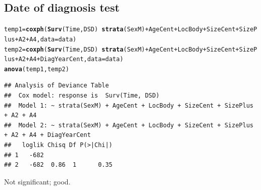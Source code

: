 \documentclass{article}\usepackage[]{graphicx}\usepackage[]{color}
\makeatletter
\newcommand{\hlopt}[1]{\textcolor[rgb]{0,0,0}{#1}}%
\newcommand{\hlstd}[1]{\textcolor[rgb]{0.345,0.345,0.345}{#1}}%
\newcommand{\hlkwb}[1]{\textcolor[rgb]{0.69,0.353,0.396}{#1}}%
\newcommand{\hlkwc}[1]{\textcolor[rgb]{0.333,0.667,0.333}{#1}}%
\newcommand{\hlkwd}[1]{\textcolor[rgb]{0.737,0.353,0.396}{\textbf{#1}}}%
\newenvironment{kframe}{%
 \def\at@end@of@kframe{}%
 \ifinner\ifhmode%
  \def\at@end@of@kframe{\end{minipage}}%
  \begin{minipage}{\columnwidth}%
 \fi\fi%
 \def\FrameCommand##1{\hskip\@totalleftmargin \hskip-\fboxsep
 \colorbox{shadecolor}{##1}\hskip-\fboxsep
     \hskip-\linewidth \hskip-\@totalleftmargin \hskip\columnwidth}%
 \MakeFramed {\advance\hsize-\width
   \@totalleftmargin\z@ \linewidth\hsize
   \@setminipage}}%
 {\par\unskip\endMakeFramed%
 \at@end@of@kframe}
\newenvironment{knitrout}{}{} %
\makeatother
\begin{document}
\subsection{Date of diagnosis test}
\begin{knitrout}
\color{fgcolor}\begin{kframe}
\begin{alltt}
\hlstd{temp1} \hlkwb{=} \hlkwd{coxph}\hlstd{(}\hlkwd{Surv}\hlstd{(Time, DSD)} \hlopt{~} \hlkwd{strata}\hlstd{(SexM)} \hlopt{+} \hlstd{AgeCent} \hlopt{+} \hlstd{LocBody} \hlopt{+} \hlstd{SizeCent} \hlopt{+} \hlstd{SizePlus} \hlopt{+} \hlstd{A2} \hlopt{+} \hlstd{A4,} \hlkwc{data} \hlstd{= data)}
\hlstd{temp2} \hlkwb{=} \hlkwd{coxph}\hlstd{(}\hlkwd{Surv}\hlstd{(Time, DSD)} \hlopt{~} \hlkwd{strata}\hlstd{(SexM)} \hlopt{+} \hlstd{AgeCent} \hlopt{+} \hlstd{LocBody} \hlopt{+} \hlstd{SizeCent} \hlopt{+} \hlstd{SizePlus} \hlopt{+} \hlstd{A2} \hlopt{+} \hlstd{A4} \hlopt{+} \hlstd{DiagYearCent,} \hlkwc{data} \hlstd{= data)}
\hlkwd{anova}\hlstd{(temp1, temp2)}
\end{alltt}
\begin{verbatim}
## Analysis of Deviance Table
##  Cox model: response is  Surv(Time, DSD)
##  Model 1: ~ strata(SexM) + AgeCent + LocBody + SizeCent + SizePlus + A2 + A4
##  Model 2: ~ strata(SexM) + AgeCent + LocBody + SizeCent + SizePlus + A2 + A4 + DiagYearCent
##   loglik Chisq Df P(>|Chi|)
## 1   -682                   
## 2   -682  0.86  1      0.35
\end{verbatim}
\end{kframe}
\end{knitrout}
Not significant; good.
\end{document}

